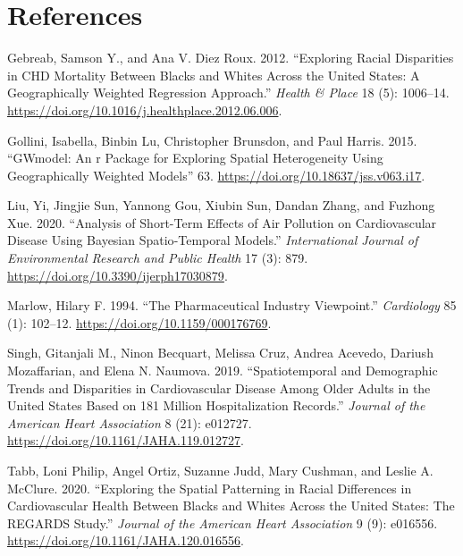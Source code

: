 \documentclass[
]{article}
\newlength{\cslhangindent}
\newenvironment{CSLReferences}[2] %
 {\begin{list}{}{%
  \setlength{\itemindent}{0pt}
  \setlength{\leftmargin}{0pt}
  \setlength{\parsep}{0pt}
  \ifodd #1
   \setlength{\leftmargin}{\cslhangindent}
   \setlength{\itemindent}{-1\cslhangindent}
  \fi
  \setlength{\itemsep}{#2\baselineskip}}}
 {\end{list}}
\begin{document}
\newpage{}

\section*{References}\label{references}

\label{refs}
\begin{CSLReferences}{1}{0}
Gebreab, Samson Y., and Ana V. Diez Roux. 2012. {``Exploring Racial
Disparities in {CHD} Mortality Between Blacks and Whites Across the
{United} {States}: {A} Geographically Weighted Regression Approach.''}
\emph{Health \& Place} 18 (5): 1006--14.
\url{https://doi.org/10.1016/j.healthplace.2012.06.006}.

Gollini, Isabella, Binbin Lu, Christopher Brunsdon, and Paul Harris.
2015. {``{\textbraceleft}GWmodel{\textbraceright}: An
{\textbraceleft}r{\textbraceright} Package for Exploring Spatial
Heterogeneity Using Geographically Weighted Models''} 63.
\url{https://doi.org/10.18637/jss.v063.i17}.

Liu, Yi, Jingjie Sun, Yannong Gou, Xiubin Sun, Dandan Zhang, and Fuzhong
Xue. 2020. {``Analysis of {Short}-{Term} {Effects} of {Air} {Pollution}
on {Cardiovascular} {Disease} {Using} {Bayesian} {Spatio}-{Temporal}
{Models}.''} \emph{International Journal of Environmental Research and
Public Health} 17 (3): 879.
\url{https://doi.org/10.3390/ijerph17030879}.

Marlow, Hilary F. 1994. {``The Pharmaceutical Industry Viewpoint.''}
\emph{Cardiology} 85 (1): 102--12.
\url{https://doi.org/10.1159/000176769}.

Singh, Gitanjali M., Ninon Becquart, Melissa Cruz, Andrea Acevedo,
Dariush Mozaffarian, and Elena N. Naumova. 2019. {``Spatiotemporal and
{Demographic} {Trends} and {Disparities} in {Cardiovascular} {Disease}
{Among} {Older} {Adults} in the {United} {States} {Based} on 181
{Million} {Hospitalization} {Records}.''} \emph{Journal of the American
Heart Association} 8 (21): e012727.
\url{https://doi.org/10.1161/JAHA.119.012727}.

Tabb, Loni Philip, Angel Ortiz, Suzanne Judd, Mary Cushman, and Leslie
A. McClure. 2020. {``Exploring the {Spatial} {Patterning} in {Racial}
{Differences} in {Cardiovascular} {Health} {Between} {Blacks} and
{Whites} {Across} the {United} {States}: {The} {REGARDS} {Study}.''}
\emph{Journal of the American Heart Association} 9 (9): e016556.
\url{https://doi.org/10.1161/JAHA.120.016556}.


\end{CSLReferences}
\end{document}
